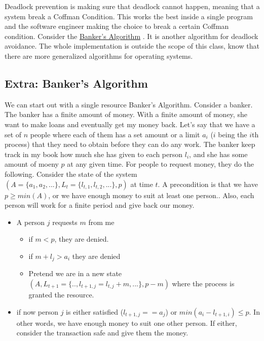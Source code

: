 Deadlock prevention is making sure that deadlock cannot happen, meaning that a system break a Coffman Condition.
This works the best inside a single program and the software engineer making the choice to break a certain Coffman condition. Consider the 
\href{https://en.wikipedia.org/wiki/Banker's\_algorithm}{Banker's Algorithm} \cite{Dijkstra:1965:CSP:1102034}.
It is another algorithm for deadlock avoidance.
The whole implementation is outside the scope of this class, know that there are more generalized algorithms for operating systems.

\subsection{Extra: Banker's Algorithm}

We can start out with a single resource Banker's Algorithm.
Consider a banker.
The banker has a finite amount of money.
With a finite amount of money, she want to make loans and eventually get my money back.
Let's say that we have a set of $n$ people where each of them has a set amount or a limit $a_i$ ($i$ being the $i$th process) that they need to obtain before they can do any work.
The banker keep track in my book how much she has given to each person $l_i$, and she has some amount of moeny $p$ at any given time.
For people to request money, they do the following.
Consider the state of the system $(A=\{a_1, a_2, ...\}, L_t=\{l_{t,1}, l_{t,2}, ...\}, p)$ at time $t$.
A precondition is that we have $p \geq min(A)$, or we have enough money to suit at least one person..
Also, each person will work for a finite period and give back our money.

\begin{itemize}
\item A person $j$ requests $m$ from me
\begin{itemize}
\item if $m < p$, they are denied.
\item if $m + l_j > a_i$ they are denied
\item Pretend we are in a new state $(A, L_{t+1}=\{.., l_{t+1, j} = l_{t, j} + m, ...\}, p - m)$ where the process is granted the resource.
\end{itemize}
\item if now person $j$ is either satisfied ($l_{t+1,j} == a_j$) or $min(a_i - l_{t+1, i}) \leq p$. In other words, we have enough money to suit one other person. If either, consider the transaction safe and give them the money.
\end{itemize}

